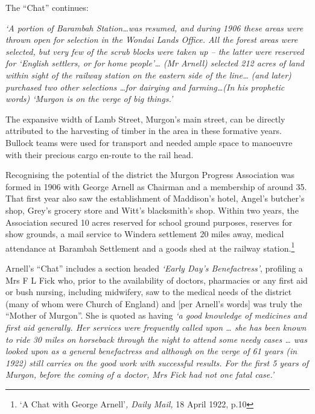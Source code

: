The ``Chat'' continues:



\emph{`A portion of Barambah Station\ldots was resumed, and during 1906 these areas were thrown open for selection in the Wondai Lands Office. All the forest areas were selected, but very few of the scrub blocks were taken up -- the latter were reserved for `English settlers, or for home people'\ldots{} (Mr Arnell) selected 212 acres of land within sight of the railway station on the eastern side of the line\ldots{} (and later) purchased two other selections \ldots for dairying and farming\ldots(In his prophetic words) `Murgon is on the verge of big things.'}



\smallskip


The expansive width of Lamb Street, Murgon's main street, can be directly attributed to the harvesting of timber in the area in these formative years. Bullock teams were used for transport and needed ample space to manoeuvre with their precious cargo en-route to the rail head.



Recognising the potential of the district the Murgon Progress Association was formed in 1906 with George Arnell as Chairman and a membership of around 35. That first year also saw the establishment of Maddison's hotel, Angel's butcher's shop, Grey's grocery store and Witt's blacksmith's shop. Within two years, the Association secured 10 acres reserved for school ground purposes, reserves for show grounds, a mail service to Windera settlement 20 miles away, medical attendance at Barambah Settlement and a goods shed at the railway station.\footnote{`A Chat with George Arnell'\emph{, Daily Mail,} 18 April 1922, p.10}


Arnell's ``Chat'' includes a section headed \emph{`Early Day's Benefactress'}, profiling a Mrs F L Fick who, prior to the availability of doctors, pharmacies or any first aid or bush nursing, including midwifery, saw to the medical needs of the district (many of whom were Church of England) and {[}per Arnell's words{]} was truly the ``Mother of Murgon''. She is quoted as having \emph{`a good knowledge of medicines and first aid generally. Her services were frequently called upon \ldots{} she has been known to ride 30 miles on horseback through the night to attend some needy cases \ldots{} was looked upon as a general benefactress and although on the verge of 61 years (in 1922) still carries on the good work with successful results. For the first 5 years of Murgon, before the coming of a doctor, Mrs Fick had not one fatal case.'}



